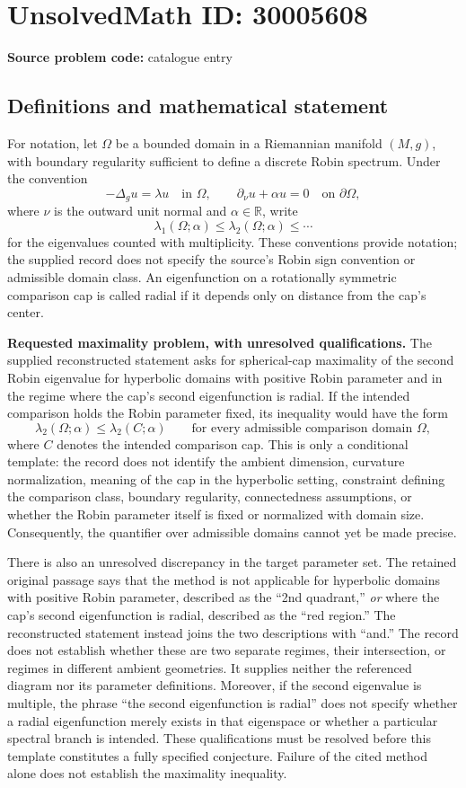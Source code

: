 \documentclass[11pt]{article}
\newcommand{\R}{\mathbb{R}}
\begin{document}
\section*{UnsolvedMath ID: 30005608}
\textbf{Source problem code:} catalogue entry
\subsection{Definitions and mathematical statement}
For notation, let \(\Omega\) be a bounded domain in a Riemannian manifold \((M,g)\), with boundary regularity sufficient to define a discrete Robin spectrum. Under the convention
\[
-\Delta_g u=\lambda u\quad\text{in }\Omega,
\qquad
\partial_\nu u+\alpha u=0\quad\text{on }\partial\Omega,
\]
where \(\nu\) is the outward unit normal and \(\alpha\in\R\), write
\[
\lambda_1(\Omega;\alpha)\leq\lambda_2(\Omega;\alpha)\leq\cdots
\]
for the eigenvalues counted with multiplicity. These conventions provide notation; the supplied record does not specify the source's Robin sign convention or admissible domain class. An eigenfunction on a rotationally symmetric comparison cap is called radial if it depends only on distance from the cap's center.

\textbf{Requested maximality problem, with unresolved qualifications.} The supplied reconstructed statement asks for spherical-cap maximality of the second Robin eigenvalue for hyperbolic domains with positive Robin parameter and in the regime where the cap's second eigenfunction is radial. If the intended comparison holds the Robin parameter fixed, its inequality would have the form
\[
\lambda_2(\Omega;\alpha)\leq\lambda_2(C;\alpha)
\qquad\text{for every admissible comparison domain }\Omega,
\]
where \(C\) denotes the intended comparison cap. This is only a conditional template: the record does not identify the ambient dimension, curvature normalization, meaning of the cap in the hyperbolic setting, constraint defining the comparison class, boundary regularity, connectedness assumptions, or whether the Robin parameter itself is fixed or normalized with domain size. Consequently, the quantifier over admissible domains cannot yet be made precise.

There is also an unresolved discrepancy in the target parameter set. The retained original passage says that the method is not applicable for hyperbolic domains with positive Robin parameter, described as the ``2nd quadrant,'' \emph{or} where the cap's second eigenfunction is radial, described as the ``red region.'' The reconstructed statement instead joins the two descriptions with ``and.'' The record does not establish whether these are two separate regimes, their intersection, or regimes in different ambient geometries. It supplies neither the referenced diagram nor its parameter definitions. Moreover, if the second eigenvalue is multiple, the phrase ``the second eigenfunction is radial'' does not specify whether a radial eigenfunction merely exists in that eigenspace or whether a particular spectral branch is intended. These qualifications must be resolved before this template constitutes a fully specified conjecture. Failure of the cited method alone does not establish the maximality inequality.
\end{document}
